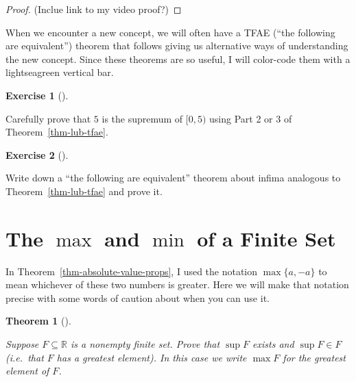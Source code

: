 \documentclass[
  letterpaper,
  DIV=11,
  numbers=noendperiod]{scrreprt}
\def\R{\mathbb R}
\theoremstyle{plain}
\newtheorem{theorem}{Theorem}[chapter]
\theoremstyle{definition}
\newtheorem{exercise}{Exercise}[chapter]
\theoremstyle{plain}
\theoremstyle{plain}
\theoremstyle{definition}
\theoremstyle{definition}
\theoremstyle{remark}
\begin{document}
\begin{proof}
(Inclue link to my video proof?)
\end{proof}

\begin{tcolorbox}[enhanced jigsaw, titlerule=0mm, opacitybacktitle=0.6, leftrule=.75mm, bottomrule=.15mm, left=2mm, arc=.35mm, colback=white, rightrule=.15mm, colframe=quarto-callout-note-color-frame, toptitle=1mm, breakable, opacityback=0, colbacktitle=quarto-callout-note-color!10!white, bottomtitle=1mm, title=\textcolor{quarto-callout-note-color}{\faInfo}\hspace{0.5em}{Note}, coltitle=black, toprule=.15mm]

When we encounter a new concept, we will often have a TFAE (``the
following are equivalent'') theorem that follows giving us alternative
ways of understanding the new concept. Since these theorems are so
useful, I will color-code them with a {lightseagreen} vertical bar.

\end{tcolorbox}

\begin{exercise}[]\protect\hypertarget{exr-reproof-of-sup-basic}{}\label{exr-reproof-of-sup-basic}

Carefully prove that \(5\) is the supremum of \([0,5)\) using Part 2 or
3 of Theorem~\ref{thm-lub-tfae}.

\end{exercise}

\begin{exercise}[]\protect\hypertarget{exr-inf-tfae}{}\label{exr-inf-tfae}

Write down a ``the following are equivalent'' theorem about infima
analogous to Theorem~\ref{thm-lub-tfae} and prove it.

\end{exercise}

\section{\texorpdfstring{The \(\max\) and \(\min\) of a Finite
Set}{The \textbackslash max and \textbackslash min of a Finite Set}}\label{the-max-and-min-of-a-finite-set}

In Theorem~\ref{thm-absolute-value-props}, I used the notation
\(\max\{a,-a\}\) to mean whichever of these two numbers is greater. Here
we will make that notation precise with some words of caution about when
you can use it.

\begin{theorem}[]\protect\hypertarget{thm-max-of-finite-set}{}\label{thm-max-of-finite-set}

Suppose \(F\subseteq\R\) is a nonempty finite set. Prove that \(\sup F\)
exists and \(\sup F\in F\) (i.e.~that \(F\) has a greatest element). In
this case we write \(\max F\) for the greatest element of \(F\).

\end{theorem}
\end{document}
